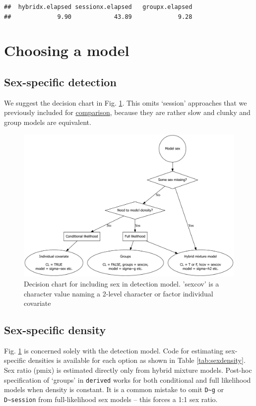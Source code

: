 \documentclass[
]{book}
\begin{document}
\begin{verbatim}
##  hybridx.elapsed sessionx.elapsed   groupx.elapsed 
##             9.90            43.89             9.28
\end{verbatim}

\section{Choosing a model}\label{decisionchart}

\subsection{Sex-specific detection}\label{sex-specific-detection}

We suggest the decision chart in Fig. \ref{fig:chart}. This omits `session' approaches that we previously included for \hyperref[demonstration]{comparison}, because they are rather slow and clunky and group models are equivalent.

\begin{figure}
\includegraphics[width=0.95\linewidth]{figures/chart} \caption{Decision chart for including sex in detection model. 'sexcov' is a character value naming a 2-level character or factor individual covariate}\label{fig:chart}
\end{figure}

\subsection{Sex-specific density}\label{sex-specific-density}

Fig. \ref{fig:chart} is concerned solely with the detection model. Code for estimating sex-specific densities is available for each option as shown in Table \ref{tab:sexdensity}. Sex ratio (pmix) is estimated directly only from hybrid mixture models. Post-hoc specification of `groups' in \texttt{derived} works for both conditional and full likelihood models when density is constant. It is a common mistake to omit \texttt{D\textasciitilde{}g} or \texttt{D\textasciitilde{}session} from full-likelihood sex models -- this forces a 1:1 sex ratio.
\end{document}
